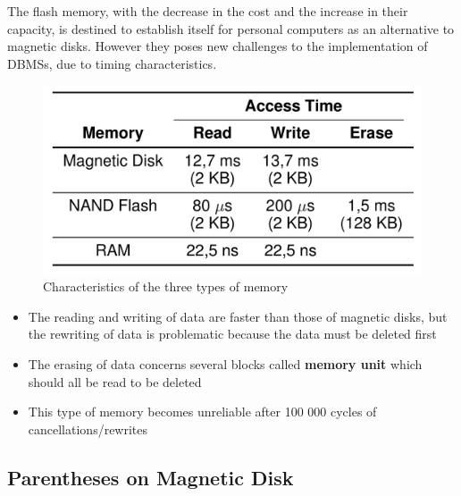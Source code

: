 The flash memory, with the decrease in the cost and the increase in their capacity, is destined to establish itself for personal computers as an alternative to magnetic disks. However they poses new challenges to the implementation of DBMSs, due to timing characteristics.
\begin{figure}[!h]
        \centering
        \includegraphics[width=0.5\linewidth]{images/DBMS_Internals/memory_types.jpeg}
        \caption{Characteristics of the three types of memory}
    \end{figure}
\begin{itemize}
    \item The reading and writing of data are faster than those of magnetic disks, but the rewriting of data is problematic because the data must be deleted first
    \item The erasing of data concerns several blocks called \textbf{memory unit} which should all be read to be deleted
    \item This type of memory becomes unreliable after 100 000 cycles of cancellations/rewrites
\end{itemize}

\subsection{Parentheses on Magnetic Disk}

